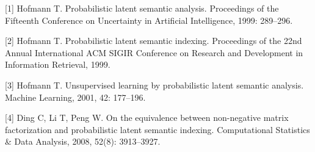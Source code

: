 \documentclass[UTF8, 12pt, fontset=fandol, oneside]{ctexart}
\begin{document}
[1] Hofmann T. Probabilistic latent semantic analysis. Proceedings of the Fifteenth Conference on Uncertainty in Artificial Intelligence, 1999: 289--296.

[2] Hofmann T. Probabilistic latent semantic indexing. Proceedings of the 22nd Annual International ACM SIGIR Conference on Research and Development in Information Retrieval, 1999.

[3] Hofmann T. Unsupervised learning by probabilistic latent semantic analysis. Machine Learning, 2001, 42: 177--196.

[4] Ding C, Li T, Peng W. On the equivalence between non-negative matrix factorization and probabilistic latent semantic indexing. Computational Statistics \& Data Analysis, 2008, 52(8): 3913--3927.
\end{document}
